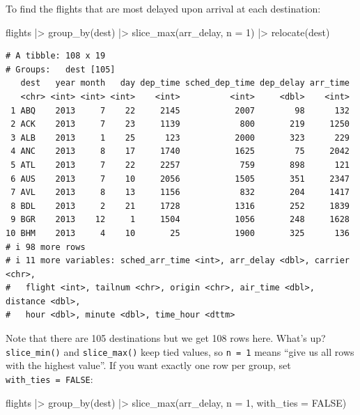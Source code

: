 \documentclass[
  letterpaper,
  DIV=11,
  numbers=noendperiod]{scrreprt}
\newenvironment{Shaded}{\begin{snugshade}}{\end{snugshade}}
\newcommand{\AttributeTok}[1]{\textcolor[rgb]{0.40,0.45,0.13}{#1}}
\newcommand{\ConstantTok}[1]{\textcolor[rgb]{0.56,0.35,0.01}{#1}}
\newcommand{\DecValTok}[1]{\textcolor[rgb]{0.68,0.00,0.00}{#1}}
\newcommand{\FunctionTok}[1]{\textcolor[rgb]{0.28,0.35,0.67}{#1}}
\newcommand{\NormalTok}[1]{\textcolor[rgb]{0.00,0.23,0.31}{#1}}
\newcommand{\SpecialCharTok}[1]{\textcolor[rgb]{0.37,0.37,0.37}{#1}}
\begin{document}
To find the flights that are most delayed upon arrival at each
destination:

\begin{Shaded}
\begin{Highlighting}[]
\NormalTok{flights }\SpecialCharTok{|\textgreater{}}
  \FunctionTok{group\_by}\NormalTok{(dest) }\SpecialCharTok{|\textgreater{}}
  \FunctionTok{slice\_max}\NormalTok{(arr\_delay, }\AttributeTok{n =} \DecValTok{1}\NormalTok{) }\SpecialCharTok{|\textgreater{}}
  \FunctionTok{relocate}\NormalTok{(dest)}
\end{Highlighting}
\end{Shaded}

\begin{verbatim}
# A tibble: 108 x 19
# Groups:   dest [105]
   dest   year month   day dep_time sched_dep_time dep_delay arr_time
   <chr> <int> <int> <int>    <int>          <int>     <dbl>    <int>
 1 ABQ    2013     7    22     2145           2007        98      132
 2 ACK    2013     7    23     1139            800       219     1250
 3 ALB    2013     1    25      123           2000       323      229
 4 ANC    2013     8    17     1740           1625        75     2042
 5 ATL    2013     7    22     2257            759       898      121
 6 AUS    2013     7    10     2056           1505       351     2347
 7 AVL    2013     8    13     1156            832       204     1417
 8 BDL    2013     2    21     1728           1316       252     1839
 9 BGR    2013    12     1     1504           1056       248     1628
10 BHM    2013     4    10       25           1900       325      136
# i 98 more rows
# i 11 more variables: sched_arr_time <int>, arr_delay <dbl>, carrier <chr>,
#   flight <int>, tailnum <chr>, origin <chr>, air_time <dbl>, distance <dbl>,
#   hour <dbl>, minute <dbl>, time_hour <dttm>
\end{verbatim}

Note that there are 105 destinations but we get 108 rows here. What's
up? \texttt{slice\_min()} and \texttt{slice\_max()} keep tied values, so
\texttt{n\ =\ 1} means ``give us all rows with the highest value''. If
you want exactly one row per group, set \texttt{with\_ties\ =\ FALSE}:

\begin{Shaded}
\begin{Highlighting}[]
\NormalTok{flights }\SpecialCharTok{|\textgreater{}}
  \FunctionTok{group\_by}\NormalTok{(dest) }\SpecialCharTok{|\textgreater{}}
  \FunctionTok{slice\_max}\NormalTok{(arr\_delay, }\AttributeTok{n =} \DecValTok{1}\NormalTok{, }\AttributeTok{with\_ties =} \ConstantTok{FALSE}\NormalTok{)}
\end{Highlighting}
\end{Shaded}
\end{document}

